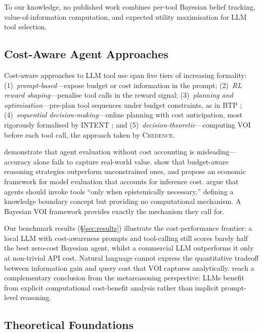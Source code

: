 \documentclass[11pt]{article}
\newcommand{\credence}{\textsc{Credence}}
\begin{document}
To our knowledge, no published work combines per-tool Bayesian belief tracking, value-of-information computation, and expected utility maximisation for LLM tool selection.

\subsection{Cost-Aware Agent Approaches}

Cost-aware approaches to LLM tool use span five tiers of increasing formality: (1)~\emph{prompt-based}---expose budget or cost information in the prompt; (2)~\emph{RL reward shaping}---penalise tool calls in the reward signal; (3)~\emph{planning and optimisation}---pre-plan tool sequences under budget constraints, as in BTP \citep{zheng2024btp}; (4)~\emph{sequential decision-making}---online planning with cost anticipation, most rigorously formalised by INTENT \citep{liu2026intent}; and (5)~\emph{decision-theoretic}---computing VOI before each tool call, the approach taken by \credence{}.

\citet{kapoor2025agents} demonstrate that agent evaluation without cost accounting is misleading---accuracy alone fails to capture real-world value. \citet{wang2024tokeneconomies} show that budget-aware reasoning strategies outperform unconstrained ones, and \citet{erol2025costofpass} propose an economic framework for model evaluation that accounts for inference cost. \citet{wang2025epistemic} argue that agents should invoke tools ``only when epistemically necessary,'' defining a knowledge boundary concept but providing no computational mechanism. A Bayesian VOI framework provides exactly the mechanism they call for.

Our benchmark results (\S\ref{sec:results}) illustrate the cost-performance frontier: a local LLM with cost-awareness prompts and tool-calling still scores barely half the best zero-cost Bayesian agent, whilst a commercial LLM outperforms it only at non-trivial API cost. Natural language cannot express the quantitative tradeoff between information gain and query cost that VOI captures analytically. \citet{desabbata2024metareasoning} reach a complementary conclusion from the metareasoning perspective: LLMs benefit from explicit computational cost-benefit analysis rather than implicit prompt-level reasoning.

\subsection{Theoretical Foundations}
\end{document}
